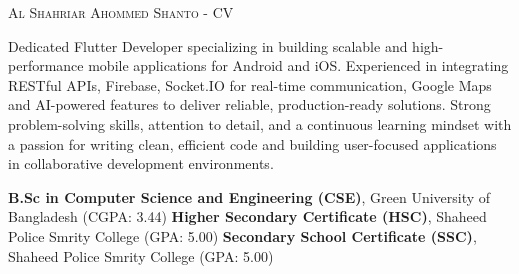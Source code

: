 \documentclass[localFont,alternative,monochrome]{documentMETADATA}
\begin{document}
	\makecvheader

	\makecvfooter
		{\textsc{}} %
		{\textsc{Al Shahriar Ahommed Shanto - CV}}
		{\thepage}

	\par{
	Dedicated Flutter Developer specializing in building scalable and high-performance mobile applications for Android and iOS. Experienced in integrating RESTful APIs, Firebase, Socket.IO for real-time communication, Google Maps and AI-powered features to deliver reliable, production-ready solutions. Strong problem-solving skills, attention to detail, and a continuous learning mindset with a passion for writing clean, efficient code and building user-focused applications in collaborative development environments.
	}
	\vspace{-0.4em}

	\begin{scholarship}
						{\textbf{B.Sc in Computer Science and Engineering (CSE)}, Green University of Bangladesh (CGPA: 3.44)}
						{\textbf{Higher Secondary Certificate (HSC)}, Shaheed Police Smrity College (GPA: 5.00)}
						{\textbf{Secondary School Certificate (SSC)}, Shaheed Police Smrity College (GPA: 5.00)}
	\end{scholarship}
\end{document}
